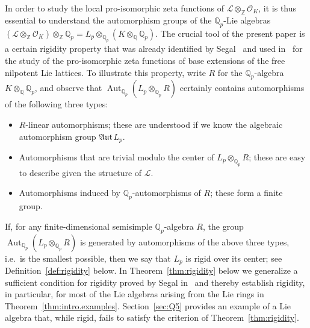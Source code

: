 \documentclass[11pt,a4paper]{amsart}
\theoremstyle{plain}
\theoremstyle{remark}
\newcommand{\Z}{\mathbb{Z}}
\newcommand{\Q}{\mathbb{Q}}
\newcommand{\tensor}{\otimes}
\DeclareMathOperator{\Aut}{Aut}
\def \aAut {\mathfrak{Aut} \,}
\begin{document}
In order to study the local pro-isomorphic zeta functions of $\mathcal{L} \tensor_\Z \mathcal{O}_K$, it is thus essential to understand the automorphism groups of the $\Q_p$-Lie algebras $(\mathcal{L} \tensor_\Z \mathcal{O}_K) \tensor_\Z \Q_p = {L}_p \tensor_{\Q_p} (K \tensor_\Q \Q_p)$.  The crucial tool of the present paper is a certain rigidity property that was already identified by Segal~\cite{Segal/89} and used in~\cite{GSS/88} for the study of the pro-isomorphic zeta functions of base extensions of the free nilpotent Lie lattices.  To illustrate this property, write $R$ for the $\Q_p$-algebra $K \tensor_\Q \Q_p$, and observe that $\Aut_{\Q_p} (L_p \tensor_{\Q_p} R)$ certainly contains automorphisms of the following three types:
\begin{itemize}
\item $R$-linear automorphisms; these are understood if we know the algebraic automorphism group $\aAut L_p$.
\item Automorphisms that are trivial modulo the center of $L_p \tensor_{\Q_p} R$; these are easy to describe given the structure of $\mathcal{L}$.
\item Automorphisms induced by $\Q_p$-automorphisms of $R$; these form a finite group.
\end{itemize}
If, for any finite-dimensional semisimple $\Q_p$-algebra $R$, the group $\Aut_{\Q_p}(L_p \tensor_{\Q_p} R)$ is generated by automorphisms of the above three types, i.e.~is the smallest possible, then we say that $L_p$ is rigid over its center; see Definition~\ref{def:rigidity} below.  In Theorem~\ref{thm:rigidity} below we generalize a sufficient condition for rigidity proved by Segal in~\cite{Segal/89} and thereby establish rigidity, in particular, for most of the Lie algebras arising from the Lie rings in Theorem~\ref{thm:intro.examples}.  Section~\ref{sec:Q5} provides an example of a Lie algebra that, while rigid, fails to satisfy the criterion of Theorem~\ref{thm:rigidity}.
\end{document}
